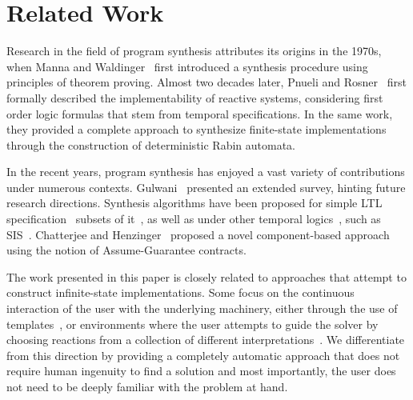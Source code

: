\section{Related Work}
\label{sec:related}


Research in the field of program synthesis attributes its origins in the 1970s,
when Manna and Waldinger~\cite{manna1971toward} first introduced a synthesis
procedure using principles of theorem proving. Almost two decades later, Pnueli
and Rosner~\cite{DBLP:conf/popl/PnueliR89} first formally described the
implementability of reactive systems, considering first order logic formulas
that stem from temporal specifications. In the same work, they provided a
complete approach to synthesize finite-state implementations through the
construction of deterministic Rabin automata.

In the recent years, program synthesis has enjoyed a vast variety of
contributions under numerous contexts. Gulwani~\cite{gulwani2010dimensions}
presented an extended survey, hinting future research directions. Synthesis
algorithms have been proposed for simple LTL specification~\cite{Bohy12,Tini03}
subsets of it~\cite{Klein10,ehlers2010symbolic,cheng2016structural}, as well as under other temporal logics~\cite{monmege2016real,Hamza10}, such as SIS~\cite{Aziz95}.
Chatterjee and Henzinger~\cite{Chatterjee07} proposed a novel component-based approach using the notion of Assume-Guarantee contracts. 

The work presented in this paper is closely related to approaches that attempt
to construct infinite-state implementations. Some focus on the continuous
interaction of the user with the underlying machinery, either through the use of
templates~\cite{srivastava2013template,beyene2014constraint}, or environments where the user attempts to guide the solver by choosing reactions from a collection of different
interpretations~\cite{ryzhyk2016developing}. We differentiate from this
direction by providing a completely automatic approach that does not require
human ingenuity to find a solution and most importantly, the user
does not need to be deeply familiar with the problem at hand.

